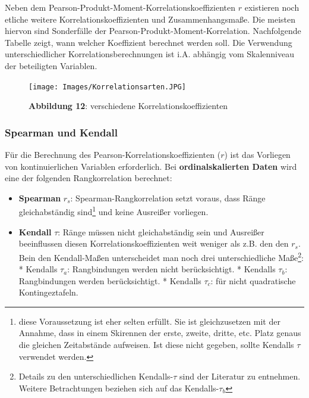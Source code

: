 \documentclass[]{article}
\providecommand{\tightlist}{%
  \setlength{\itemsep}{0pt}\setlength{\parskip}{0pt}}
\let\rmarkdownfootnote\footnote%
\def\footnote{\protect\rmarkdownfootnote}
\begin{document}
Neben dem Pearson-Produkt-Moment-Korrelationskoeffizienten \(r\) existieren noch etliche weitere Korrelationskoeffizienten und Zusammenhangsmaße. Die meisten hiervon sind Sonderfälle der Pearson-Produkt-Moment-Korrelation. Nachfolgende Tabelle zeigt, wann welcher Koeffizient berechnet werden soll. Die Verwendung unterschiedlicher Korrelationsberechnungen ist i.A. abhängig vom Skalenniveau der beteiligten Variablen.

\begin{figure}
\centering
\texttt{[image: Images/Korrelationsarten.JPG]}
\caption{\textbf{Abbildung 12}: verschiedene Korrelationskoeffizienten}
\end{figure}

\hypertarget{spearman-und-kendall}{%
\subsubsection*{Spearman und Kendall}\label{spearman-und-kendall}}

Für die Berechnung des Pearson-Korrelationskoeffizienten (\(r\)) ist das Vorliegen von kontinuierlichen Variablen erforderlich. Bei \textbf{ordinalskalierten Daten} wird eine der folgenden Rangkorrelation berechnet:

\begin{itemize}
\tightlist
\item
  \textbf{Spearman} \(r_s\): Spearman-Rangkorrelation setzt voraus, dass Ränge gleichabständig sind\footnote{diese Voraussetzung ist eher selten erfüllt. Sie ist gleichzusetzen mit der Annahme, dass in einem Skirennen der erste, zweite, dritte, etc. Platz genaus die gleichen Zeitabstände aufweisen. Ist diese nicht gegeben, sollte Kendalls \(\tau\) verwendet werden.} und keine Ausreißer vorliegen.
\item
  \textbf{Kendall} \(\tau\): Ränge müssen nicht gleichabständig sein und Ausreißer beeinflussen diesen Korrelationskoeffizienten weit weniger als z.B. den den \(r_s\). Bein den Kendall-Maßen unterscheidet man noch drei unterschiedliche Maße\footnote{Details zu den unterschiedlichen Kendalls-\(\tau\) sind der Literatur zu entnehmen. Weitere Betrachtungen beziehen sich auf das Kendalls-\(\tau_b\)}:
  * Kendalls \(\tau_a\): Rangbindungen werden nicht berücksichtigt.
  * Kendalls \(\tau_b\): Rangbindungen werden berücksichtigt.
  * Kendalls \(\tau_c\): für nicht quadratische Kontingeztafeln.
\end{itemize}
\end{document}
